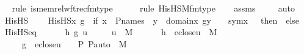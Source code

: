 \begin{isabellebody}
\ \ \isamarkupfalse%
{\isacharparenleft}{\kern0pt}rule\ is{\isacharunderscore}{\kern0pt}memrel{\isacharunderscore}{\kern0pt}wftrec{\isacharunderscore}{\kern0pt}fm{\isacharunderscore}{\kern0pt}type{\isacharparenright}{\kern0pt}\isanewline
\ \ \ \ \ \isamarkupfalse%
{\isacharparenleft}{\kern0pt}rule\ His{\isacharunderscore}{\kern0pt}HS{\isacharunderscore}{\kern0pt}M{\isacharunderscore}{\kern0pt}fm{\isacharunderscore}{\kern0pt}type{\isacharparenright}{\kern0pt}\isanewline
\ \ \isamarkupfalse%
\ assms\ \isanewline
\ \ \isamarkupfalse%
\ auto%
\endisatagproof
{\isafoldproof}%
%
\isadelimproof
\isanewline
%
\endisadelimproof
\isanewline
{}\isamarkupfalse%
\ His{\isacharunderscore}{\kern0pt}HS\ \ \isanewline
\ \ {\isachardoublequoteopen}His{\isacharunderscore}{\kern0pt}HS{\isacharparenleft}{\kern0pt}x{\isacharcomma}{\kern0pt}\ g{\isacharparenright}{\kern0pt}\ {\isasymequiv}\ if\ {\isacharparenleft}{\kern0pt}x\ {\isasymin}\ P{\isacharunderscore}{\kern0pt}names\ {\isasymand}\ {\isacharparenleft}{\kern0pt}{\isasymforall}y\ {\isasymin}\ domain{\isacharparenleft}{\kern0pt}x{\isacharparenright}{\kern0pt}{\isachardot}{\kern0pt}\ g{\isacharbackquote}{\kern0pt}y\ {\isacharequal}{\kern0pt}\ {}{\isacharparenright}{\kern0pt}\ {\isasymand}\ sym{\isacharparenleft}{\kern0pt}x{\isacharparenright}{\kern0pt}\ {\isasymin}\ {\isasymF}{\isacharparenright}{\kern0pt}\ then\ {}\ else\ {}{\isachardoublequoteclose}\ \isanewline
\isanewline
{}\isamarkupfalse%
\ His{\isacharunderscore}{\kern0pt}HS{\isacharunderscore}{\kern0pt}eq\ {\isacharcolon}{\kern0pt}\ \isanewline
\ \ \ \ {\isachardoublequoteopen}{\isasymAnd}h\ g\ u{\isachardot}{\kern0pt}\isanewline
\ \ \ \ \ u\ {\isasymin}\ M\ {\isasymLongrightarrow}\isanewline
\ \ \ \ \ h\ {\isasymin}\ eclose{\isacharparenleft}{\kern0pt}u{\isacharparenright}{\kern0pt}\ {\isasymrightarrow}\ M\ {\isasymLongrightarrow}\isanewline
\ \ \ \ \ g\ {\isasymin}\ eclose{\isacharparenleft}{\kern0pt}u{\isacharparenright}{\kern0pt}\ {\isasymtimes}\ {\isacharbraceleft}{\kern0pt}{\isacharless}{\kern0pt}{\isasymF}{\isacharcomma}{\kern0pt}\ {\isasymG}{\isacharcomma}{\kern0pt}\ P{\isacharcomma}{\kern0pt}\ P{\isacharunderscore}{\kern0pt}auto{\isachargreater}{\kern0pt}{\isacharbraceright}{\kern0pt}\ {\isasymrightarrow}\ M\ {\isasymLongrightarrow}\isanewline

\end{isabellebody}
